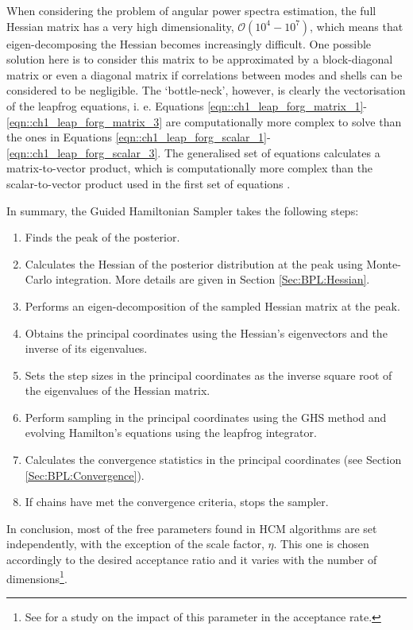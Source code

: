 \qquad When considering the problem of angular power spectra estimation, the full Hessian matrix has a very high dimensionality, $\mathcal{O}(10^{4}-10^{7})$, which means that eigen-decomposing the Hessian becomes increasingly difficult. One possible solution here is to consider this matrix to be approximated by a block-diagonal matrix or even a diagonal matrix if correlations between modes and shells can be considered to be negligible. The `bottle-neck', however, is clearly the vectorisation of the leapfrog equations, i. e. Equations \eqref{eqn::ch1_leap_forg_matrix_1}-\eqref{eqn::ch1_leap_forg_matrix_3} are computationally more complex to solve than the ones in Equations \eqref{eqn::ch1_leap_forg_scalar_1}-\eqref{eqn::ch1_leap_forg_scalar_3}. The generalised set of equations calculates a matrix-to-vector product, which is computationally more complex than the scalar-to-vector product used in the first set of equations \citep{SreeThesis}.

\qquad In summary, the Guided Hamiltonian Sampler takes the following steps:
\begin{enumerate}
\item Finds the peak of the posterior.
\item Calculates the Hessian of the posterior distribution at the peak using Monte-Carlo integration. More details are given in Section \ref{Sec:BPL:Hessian}.
\item Performs an eigen-decomposition of the sampled Hessian matrix at the peak.
\item Obtains the principal coordinates using the Hessian's eigenvectors and the inverse of its eigenvalues.
\item Sets the step sizes in the principal coordinates as the inverse square root of the eigenvalues of the Hessian matrix.
\item Perform sampling in the principal coordinates using the GHS method and evolving Hamilton's equations using the leapfrog integrator.
\item Calculates the convergence statistics in the principal coordinates (see Section \ref{Sec:BPL:Convergence}).
\item If chains have met the convergence criteria, stops the sampler.
\end{enumerate}

In conclusion, most of the free parameters found in HCM algorithms are set independently, with the exception of the scale factor, $\eta$. This one is chosen accordingly to the desired acceptance ratio and it varies with the number of dimensions\footnote{See \citealt{SreeThesis} for a study on the impact of this parameter in the acceptance rate.}.

